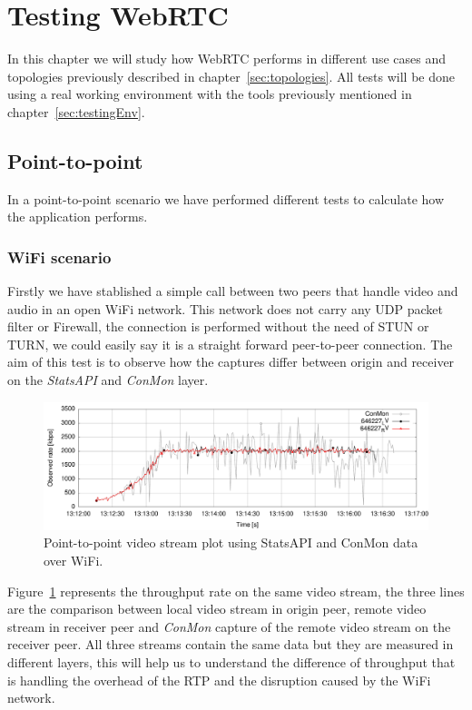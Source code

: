 \section{Testing WebRTC}

\thispagestyle{empty}

In this chapter we will study how WebRTC performs in different use cases and topologies previously described in chapter~\ref{sec:topologies}. All tests will be done using a real working environment with the tools previously mentioned in chapter~\ref{sec:testingEnv}.

\subsection{Point-to-point}

In a point-to-point scenario we have performed different tests to calculate how the application performs. 

\subsubsection{WiFi scenario}

Firstly we have stablished a simple call between two peers that handle video and audio in an open WiFi network. This network does not carry any UDP packet filter or Firewall, the connection is performed without the need of STUN or TURN, we could easily say it is a straight forward peer-to-peer connection. The aim of this test is to observe how the captures differ between origin and receiver on the {\it StatsAPI} and {\it ConMon} layer.

 \begin{figure}[h]
  \centering
    \includegraphics[width=1\textwidth]{./figures/onetoone_wifi_statsconmon.pdf}
      \caption[Point-to-point video stream plot using StatsAPI and ConMon data over WiFi]{Point-to-point video stream plot using StatsAPI and ConMon data over WiFi.}
	\label{fig:onetooneWifistatsconmon}
\end{figure}

Figure~\ref{fig:onetooneWifistatsconmon} represents the throughput rate on the same video stream, the three lines are the comparison between local video stream in origin peer, remote video stream in receiver peer and {\it ConMon} capture of the remote video stream on the receiver peer. All three streams contain the same data but they are measured in different layers, this will help us to understand the difference of throughput that is handling the overhead of the RTP and the disruption caused by the WiFi network.


